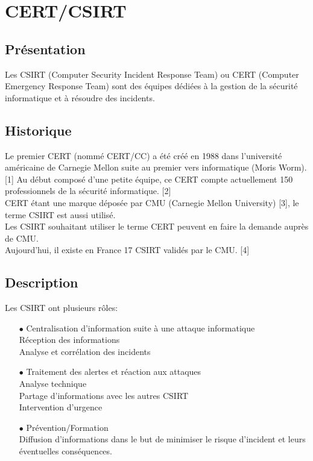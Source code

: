 \section{CERT/CSIRT}
\thispagestyle{plain}
\subsection{Présentation}
Les CSIRT (Computer Security Incident Response Team) ou CERT (Computer Emergency Response Team) sont des équipes dédiées à la gestion de la sécurité informatique et à résoudre des incidents.

\subsection{Historique}
Le premier CERT (nommé CERT/CC)  a été créé en 1988 dans l’université américaine de Carnegie Mellon suite au premier vers informatique (Moris Worm). [1]
Au début composé d’une petite équipe, ce CERT compte actuellement 150 professionnels de la sécurité informatique. [2]\\

CERT étant une marque déposée par CMU (Carnegie Mellon University) [3], le terme CSIRT est aussi utilisé.\\

Les CSIRT souhaitant utiliser le terme CERT peuvent en faire la demande auprès de CMU.\\
Aujourd’hui, il existe en France 17 CSIRT validés par le CMU. [4]\\

\subsection{Description}
Les CSIRT ont plusieurs rôles:
\begin{itemize}
\item [$\bullet$] Centralisation d’information suite à une attaque informatique\\
\subitem [$\bullet$] Réception des informations\\
\subitem [$\bullet$] Analyse et corrélation des incidents\\
\item [$\bullet$] Traitement des alertes et réaction aux attaques\\
\subitem [$\bullet$] Analyse technique\\
\subitem [$\bullet$] Partage d’informations avec les autres CSIRT\\
\subitem [$\bullet$] Intervention d’urgence\\
\item [$\bullet$] Prévention/Formation\\
\subitem [$\bullet$] Diffusion d’informations dans le but de minimiser le risque d’incident et leurs éventuelles conséquences.\\
\end{itemize}
